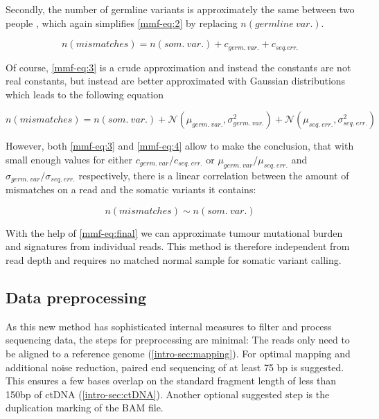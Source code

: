 Secondly, the number of germline variants is approximately the same between two people \cite{Auton2015}, which again simplifies \autoref{mmf-eq:2} by replacing $n(germline~var.)$.

\begin{equation}
n(mismatches) = n(som.~var.) + c_{germ.~var.} + c_{seq. err.}
\label{mmf-eq:3}
\end{equation}
\myequation[\ref{mmf-eq:3}]{MisMatchFinder: germline variants}

Of course, \autoref{mmf-eq:3} is a crude approximation and instead the constants are not real constants, but instead are better approximated with Gaussian distributions which leads to the following equation

\begin{equation}
n(mismatches) = n(som.~var.) + \mathcal{N}(\mu_{germ.~var.}, \sigma_{germ.~var.}^{2}) + \mathcal{N}(\mu_{seq.~err.}, \sigma_{seq.~err.}^{2})
\label{mmf-eq:4}
\end{equation}
\myequation[\ref{mmf-eq:4}]{MisMatchFinder: number of mismatches with distributions}

However, both \autoref{mmf-eq:3} and \ref{mmf-eq:4} allow to make the conclusion, that with small enough values for either $c_{germ.~var}/c_{seq.~err.}$ or $\mu_{germ.~var}/\mu_{seq.~err.}$ and $\sigma_{germ.~var}/\sigma_{seq.~err.}$ respectively, there is a linear correlation between the amount of mismatches on a read and the somatic variants it contains:

\begin{equation}
n(mismatches) \sim n(som.~var.)
\label{mmf-eq:final}
\end{equation}
\myequation[\ref{mmf-eq:final}]{MisMatchFinder: number of mismatches correlation with somatic variants}

With the help of \autoref{mmf-eq:final} we can approximate tumour mutational burden and signatures from individual reads. This method is therefore independent from read depth and requires no matched normal sample for somatic variant calling.

\subsection{Data preprocessing}
As this new method has sophisticated internal measures to filter and process sequencing data, the steps for preprocessing are minimal: The reads only need to be aligned to a reference genome (\autoref{intro-sec:mapping}). For optimal mapping and additional noise reduction, paired end sequencing of at least 75 bp is suggested. This ensures a few bases overlap on the standard fragment length of less than 150bp of ctDNA (\autoref{intro-sec:ctDNA}). Another optional suggested step is the duplication marking of the BAM file.

